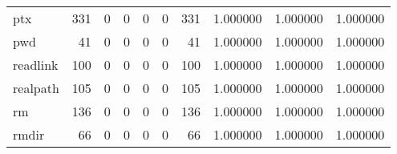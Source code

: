 \begin{longtable}{lrrrrrrrrr}
ptx       &                                       331 &                                                  0 &                                                  0 &                                                  0 &                                                  0 &                                                331 &                                           1.000000 &                               1.000000 &                             1.000000 \\
pwd       &                                        41 &                                                  0 &                                                  0 &                                                  0 &                                                  0 &                                                 41 &                                           1.000000 &                               1.000000 &                             1.000000 \\
readlink  &                                       100 &                                                  0 &                                                  0 &                                                  0 &                                                  0 &                                                100 &                                           1.000000 &                               1.000000 &                             1.000000 \\
realpath  &                                       105 &                                                  0 &                                                  0 &                                                  0 &                                                  0 &                                                105 &                                           1.000000 &                               1.000000 &                             1.000000 \\
rm        &                                       136 &                                                  0 &                                                  0 &                                                  0 &                                                  0 &                                                136 &                                           1.000000 &                               1.000000 &                             1.000000 \\
rmdir     &                                        66 &                                                  0 &                                                  0 &                                                  0 &                                                  0 &                                                 66 &                                           1.000000 &                               1.000000 &                             1.000000 \\

\end{longtable}
